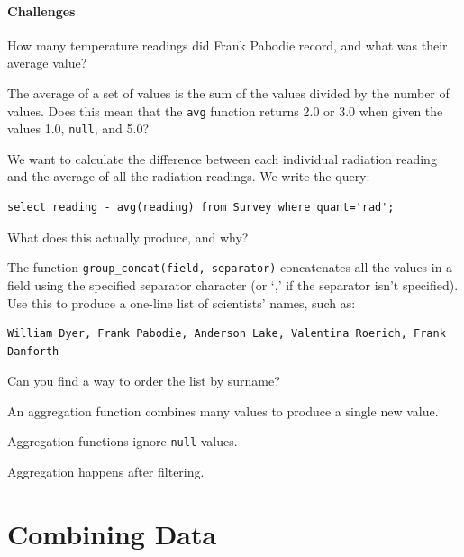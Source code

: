 \documentclass{book}
\begin{document}
\mbox{}\paragraph{Challenges}

\begin{swcenumerate}
\item
  How many temperature readings did Frank Pabodie record, and what was
  their average value?
\item
  The average of a set of values is the sum of the values divided by the
  number of values. Does this mean that the \texttt{avg} function
  returns 2.0 or 3.0 when given the values 1.0, \texttt{null}, and 5.0?
\item
  We want to calculate the difference between each individual radiation
  reading and the average of all the radiation readings. We write the
  query:

\begin{verbatim}
select reading - avg(reading) from Survey where quant='rad';
\end{verbatim}

  What does this actually produce, and why?
\item
  The function \texttt{group\_concat(field, separator)} concatenates all
  the values in a field using the specified separator character (or `,'
  if the separator isn't specified). Use this to produce a one-line list
  of scientists' names, such as:

\begin{verbatim}
William Dyer, Frank Pabodie, Anderson Lake, Valentina Roerich, Frank Danforth
\end{verbatim}

  Can you find a way to order the list by surname?
\end{swcenumerate}

\begin{keypoints}
\begin{swcitemize}
\item
  An aggregation function combines many values to produce a single new
  value.
\item
  Aggregation functions ignore \texttt{null} values.
\item
  Aggregation happens after filtering.
\end{swcitemize}
\end{keypoints}

\section{Combining Data}
\end{document}
